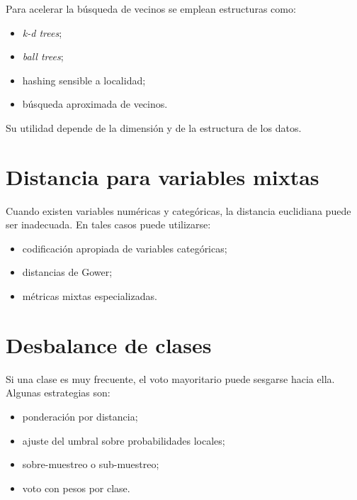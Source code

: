 \documentclass[
  spanish,
  10.5pt,
  letterpaper,
  DIV=11,
  numbers=noendperiod,
  oneside,
  open=any]{scrreprt}
\providecommand{\tightlist}{%
  \setlength{\itemsep}{0pt}\setlength{\parskip}{0pt}}
\theoremstyle{definition}
\theoremstyle{definition}
\theoremstyle{plain}
\theoremstyle{remark}
\begin{document}

Para acelerar la búsqueda de vecinos se emplean estructuras como:

\begin{itemize}
\tightlist
\item
  \emph{k-d trees};
\item
  \emph{ball trees};
\item
  hashing sensible a localidad;
\item
  búsqueda aproximada de vecinos.
\end{itemize}

Su utilidad depende de la dimensión y de la estructura de los datos.

\section*{Distancia para variables
mixtas}\label{distancia-para-variables-mixtas}


Cuando existen variables numéricas y categóricas, la distancia
euclidiana puede ser inadecuada. En tales casos puede utilizarse:

\begin{itemize}
\tightlist
\item
  codificación apropiada de variables categóricas;
\item
  distancias de Gower;
\item
  métricas mixtas especializadas.
\end{itemize}

\section*{Desbalance de clases}\label{desbalance-de-clases}


Si una clase es muy frecuente, el voto mayoritario puede sesgarse hacia
ella. Algunas estrategias son:

\begin{itemize}
\tightlist
\item
  ponderación por distancia;
\item
  ajuste del umbral sobre probabilidades locales;
\item
  sobre-muestreo o sub-muestreo;
\item
  voto con pesos por clase.
\end{itemize}
\end{document}
